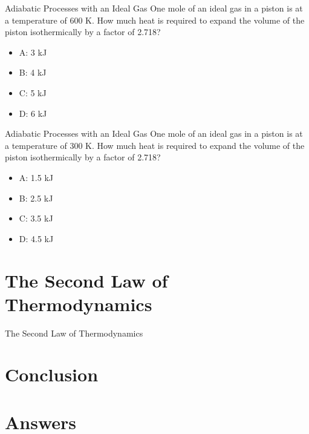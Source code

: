 \documentclass{beamer}
\begin{document}
\begin{frame}{Adiabatic Processes with an Ideal Gas}
One mole of an ideal gas in a piston is at a temperature of 600 K.  How much heat is required to expand the volume of the piston isothermically by a factor of 2.718?
\begin{itemize}
\item A: 3 kJ
\item B: 4 kJ
\item C: 5 kJ
\item D: 6 kJ
\end{itemize}
\end{frame}

\begin{frame}{Adiabatic Processes with an Ideal Gas}
One mole of an ideal gas in a piston is at a temperature of 300 K.  How much heat is required to expand the volume of the piston isothermically by a factor of 2.718?
\begin{itemize}
\item A: 1.5 kJ
\item B: 2.5 kJ
\item C: 3.5 kJ
\item D: 4.5 kJ
\end{itemize}
\end{frame}

\section{The Second Law of Thermodynamics}

\begin{frame}{The Second Law of Thermodynamics}

\end{frame}

\section{Conclusion}

\section{Answers}
\end{document}
